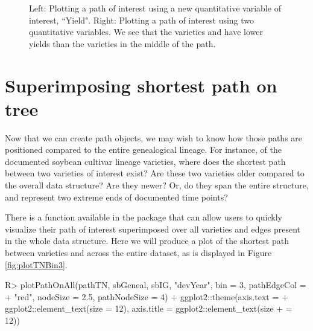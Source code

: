 \documentclass[article,shortnames]{jss}
\begin{document}
\begin{figure}[h]
    \centering
    \caption{Left: Plotting a path of interest using a new quantitative variable of interest, ``Yield". Right: Plotting a path of interest using two quantitative variables. We see that the varieties  and  have lower yields than the varieties in the middle of the path.}
    \label{fig:plotPathQV2}
\end{figure}

\section{Superimposing shortest path on tree}
\label{sspt}

Now that we can create path objects, we may wish to know how those paths are positioned compared to the entire genealogical lineage. For instance, of the documented soybean cultivar lineage varieties, where does the shortest path between two varieties of interest exist? Are these two varieties older compared to the overall data structure? Are they newer? Or, do they span the entire structure, and represent two extreme ends of documented time points?

There is a function available in the  package  that can allow users to quickly visualize their path of interest superimposed over all varieties and edges present in the whole data structure. Here we will produce a plot of the shortest path between varieties  and  across the entire dataset, as is displayed in Figure \ref{fig:plotTNBin3}.

\begin{Code}
R> plotPathOnAll(pathTN, sbGeneal, sbIG, "devYear", bin = 3, pathEdgeCol =
+    "red", nodeSize = 2.5, pathNodeSize = 4) + ggplot2::theme(axis.text =
+    ggplot2::element_text(size = 12), axis.title = ggplot2::element_text(size
+    = 12))
\end{Code}
\end{document}
